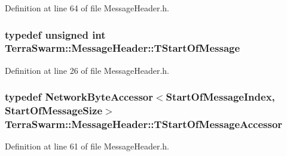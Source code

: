 Definition at line 64 of file Message\-Header.\-h.

\hypertarget{class_terra_swarm_1_1_message_header_a2cf24e4a2eb361223ae61052630dfe24}{
\subsubsection[{T\-Start\-Of\-Message}]{\setlength{\rightskip}{0pt plus 5cm}typedef unsigned int {\bf Terra\-Swarm\-::\-Message\-Header\-::\-T\-Start\-Of\-Message}\hspace{0.3cm}{\ttfamily [private]}}}\label{class_terra_swarm_1_1_message_header_a2cf24e4a2eb361223ae61052630dfe24}


Definition at line 26 of file Message\-Header.\-h.

\hypertarget{class_terra_swarm_1_1_message_header_a791ee152a9a2709c7479737dfdddfa2f}{
\subsubsection[{T\-Start\-Of\-Message\-Accessor}]{\setlength{\rightskip}{0pt plus 5cm}typedef {\bf Network\-Byte\-Accessor}$<${\bf Start\-Of\-Message\-Index}, {\bf Start\-Of\-Message\-Size}$>$ {\bf Terra\-Swarm\-::\-Message\-Header\-::\-T\-Start\-Of\-Message\-Accessor}\hspace{0.3cm}{\ttfamily [private]}}}\label{class_terra_swarm_1_1_message_header_a791ee152a9a2709c7479737dfdddfa2f}


Definition at line 61 of file Message\-Header.\-h.



